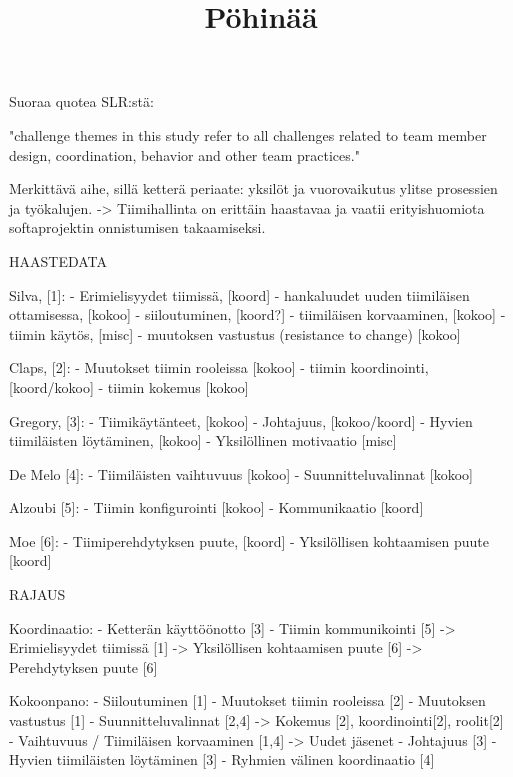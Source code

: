\title{Pöhinää}

Suoraa quotea SLR:stä: 

"challenge themes in this study refer to all challenges related to team member design, coordination, behavior and other team practices."

Merkittävä aihe, sillä ketterä periaate: yksilöt ja vuorovaikutus ylitse prosessien ja työkalujen.
-> Tiimihallinta on erittäin haastavaa ja vaatii erityishuomiota softaprojektin onnistumisen takaamiseksi.

            HAASTEDATA

Silva,      [1]: 
- Erimielisyydet tiimissä,                      [koord]
- hankaluudet uuden tiimiläisen ottamisessa,    [kokoo]
- siiloutuminen,                                [koord?]
- tiimiläisen korvaaminen,                      [kokoo]
- tiimin käytös,                                [misc]
- muutoksen vastustus (resistance to change)    [kokoo]

Claps,      [2]:
- Muutokset tiimin rooleissa                    [kokoo]
- tiimin koordinointi,                          [koord/kokoo]
- tiimin kokemus                                [kokoo]

Gregory,    [3]:
- Tiimikäytänteet,                              [kokoo]
- Johtajuus,                                    [kokoo/koord]
- Hyvien tiimiläisten löytäminen,               [kokoo]
- Yksilöllinen motivaatio                       [misc]

De Melo     [4]:
- Tiimiläisten vaihtuvuus                       [kokoo]
- Suunnitteluvalinnat                           [kokoo]

Alzoubi     [5]:
- Tiimin konfigurointi                          [kokoo]
- Kommunikaatio                                 [koord]

Moe         [6]:
- Tiimiperehdytyksen puute,                     [koord]
- Yksilöllisen kohtaamisen puute                [koord]

    RAJAUS

Koordinaatio:
- Ketterän käyttöönotto                     [3]
- Tiimin kommunikointi                      [5]
    -> Erimielisyydet tiimissä              [1]
    -> Yksilöllisen kohtaamisen puute       [6]
    -> Perehdytyksen puute                  [6]

Kokoonpano:
- Siiloutuminen                             [1]
- Muutokset tiimin rooleissa                [2]
- Muutoksen vastustus                       [1]
- Suunnitteluvalinnat                       [2,4]
    -> Kokemus [2], koordinointi[2], roolit[2]
- Vaihtuvuus / Tiimiläisen korvaaminen      [1,4]
    -> Uudet jäsenet
- Johtajuus                                 [3]
- Hyvien tiimiläisten löytäminen            [3]
- Ryhmien välinen koordinaatio              [4]

